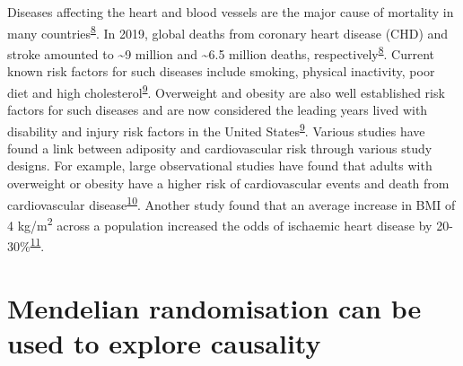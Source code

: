 \documentclass[11pt,twoside]{bristolthesis}
\begin{document}
Diseases affecting the heart and blood vessels are the major cause of mortality in many countries\textsuperscript{\protect\hyperlink{ref-BritishHeartFoundation2021}{8}}. In 2019, global deaths from coronary heart disease (CHD) and stroke amounted to \textasciitilde9 million and \textasciitilde6.5 million deaths, respectively\textsuperscript{\protect\hyperlink{ref-BritishHeartFoundation2021}{8}}. Current known risk factors for such diseases include smoking, physical inactivity, poor diet and high cholesterol\textsuperscript{\protect\hyperlink{ref-Virani2021}{9}}. Overweight and obesity are also well established risk factors for such diseases and are now considered the leading years lived with disability and injury risk factors in the United States\textsuperscript{\protect\hyperlink{ref-Virani2021}{9}}. Various studies have found a link between adiposity and cardiovascular risk through various study designs. For example, large observational studies have found that adults with overweight or obesity have a higher risk of cardiovascular events and death from cardiovascular disease\textsuperscript{\protect\hyperlink{ref-Khan2018}{10}}. Another study found that an average increase in BMI of 4 kg/m\textsuperscript{2} across a population increased the odds of ischaemic heart disease by 20-30\%\textsuperscript{\protect\hyperlink{ref-Nordestgaard2012}{11}}.

\hypertarget{mendelian-randomisation-can-be-used-to-explore-causality}{%
\section{Mendelian randomisation can be used to explore causality}\label{mendelian-randomisation-can-be-used-to-explore-causality}}
\end{document}

